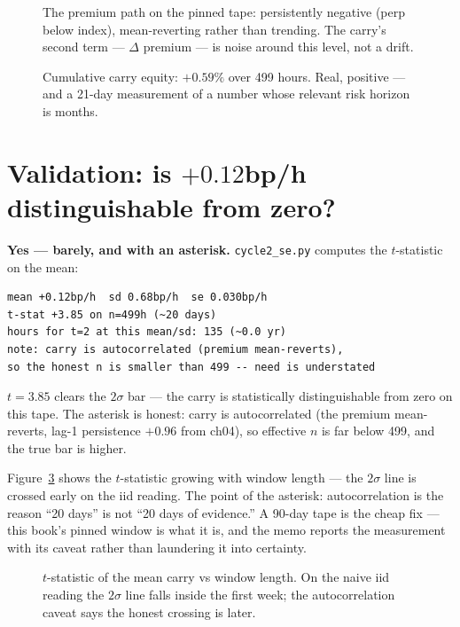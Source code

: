 \begin{figure}[htbp]\centering

\caption{The premium path on the pinned tape: persistently
negative (perp below index), mean-reverting rather than
trending. The carry's second term --- $\Delta$ premium --- is
noise around this level, not a drift.}
\label{fig:prempath}
\end{figure}

\begin{figure}[htbp]\centering

\caption{Cumulative carry equity: $+0.59\%$ over 499 hours.
Real, positive --- and a 21-day measurement of a number whose
relevant risk horizon is months.}
\label{fig:carryeq}
\end{figure}

\section{Validation: is $+0.12$bp/h distinguishable from zero?}\label{sec:val18}

\begin{example}\label{ex:tstat18}
\textbf{Yes --- barely, and with an asterisk.}
\texttt{cycle2\_se.py} computes the $t$-statistic on the mean:
\begin{verbatim}
mean +0.12bp/h  sd 0.68bp/h  se 0.030bp/h
t-stat +3.85 on n=499h (~20 days)
hours for t=2 at this mean/sd: 135 (~0.0 yr)
note: carry is autocorrelated (premium mean-reverts),
so the honest n is smaller than 499 -- need is understated
\end{verbatim}
$t=3.85$ clears the $2\sigma$ bar --- the carry is statistically
distinguishable from zero on this tape. The asterisk is
honest: carry is autocorrelated (the premium mean-reverts,
lag-1 persistence $+0.96$ from ch04), so effective $n$ is far
below 499, and the true bar is higher.
\begin{solution}
Figure~\ref{fig:tstat} shows the $t$-statistic growing with
window length --- the $2\sigma$ line is crossed early on the
iid reading. The point of the asterisk: autocorrelation is the
reason ``20 days'' is not ``20 days of evidence.'' A 90-day
tape is the cheap fix --- this book's pinned window is what it
is, and the memo reports the measurement with its caveat rather
than laundering it into certainty.
\end{solution}
\end{example}

\begin{figure}[htbp]\centering

\caption{$t$-statistic of the mean carry vs window length. On
the naive iid reading the $2\sigma$ line falls inside the first
week; the autocorrelation caveat says the honest crossing is
later.}
\label{fig:tstat}
\end{figure}

